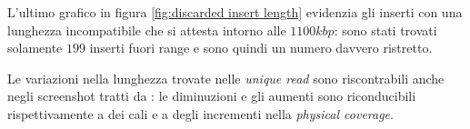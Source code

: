 L'ultimo grafico in figura \ref{fig:discarded insert length} evidenzia gli inserti con una lunghezza incompatibile che si attesta intorno alle $1100kbp$: sono stati trovati solamente $199$ inserti fuori range e sono quindi un numero davvero ristretto.

Le variazioni nella lunghezza trovate nelle \emph{unique read} sono riscontrabili anche negli screenshot tratti da : le diminuzioni e gli aumenti sono riconducibili rispettivamente a dei cali e a degli incrementi nella \emph{physical coverage}.